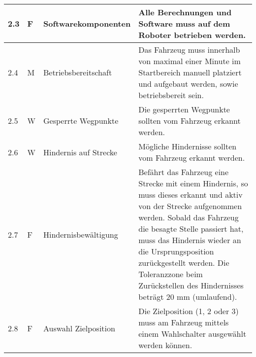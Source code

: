 \documentclass[main.tex]{subfiles} %
\begin{document}
\begin{tabular}{|l|p{0.5cm}|p{4cm}|p{10cm}|}
  \hline
  2.3          & F                     & Softwarekomponenten                                                   & Alle Berechnungen und Software muss auf dem Roboter betrieben werden.                                                                                                                                                                                                                                                                                                                                              \\
  \hline
  2.4          & M                     & Betriebsbereitschaft                                                  & Das Fahrzeug muss innerhalb von maximal einer Minute im Startbereich manuell platziert und aufgebaut werden, sowie betriebsbereit sein.                                                                                                                                                                                                    \\
  \hline
  2.5          & W                     & Gesperrte Wegpunkte                                                   & Die gesperrten Wegpunkte sollten vom Fahrzeug erkannt werden.                                                                                                                                                                                                                                                                              \\
  \hline
  2.6          & W                     & Hindernis auf Strecke                                                 & Mögliche Hindernisse sollten vom Fahrzeug erkannt werden.                                                                                                                                                                                                                                                                                  \\
  \hline
  2.7          & F                     & Hindernisbewältigung                                                  & Befährt das Fahrzeug eine Strecke mit einem Hindernis, so muss dieses erkannt und aktiv von der Strecke aufgenommen werden. Sobald das Fahrzeug die besagte Stelle passiert hat, muss das Hindernis wieder an die Ursprungsposition zurückgestellt werden. Die Toleranzzone beim Zurückstellen des Hindernisses beträgt 20 mm (umlaufend). \\
  \hline
  2.8          & F                     & Auswahl Zielposition                                                  & Die Zielposition (1, 2 oder 3) muss am Fahrzeug mittels einem Wahlschalter ausgewählt werden können.                                                                                                                                                                                                                                       \\

\end{tabular}
\end{document}
